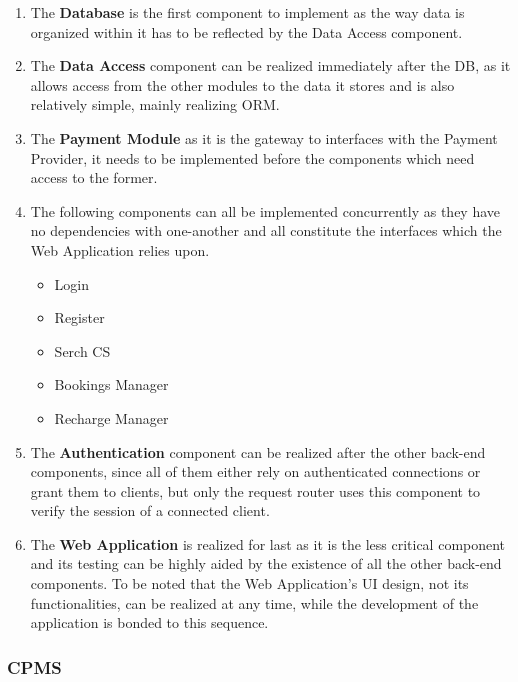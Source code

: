 \documentclass[11pt]{article}
\begin{document}
\begin{enumerate}
    \item The \textbf{Database} is the first component to implement as the way data is organized within it has to be reflected by the Data Access component.
    \item The \textbf{Data Access} component can be realized immediately after the DB, as it allows access from the other modules to the data it stores and is also relatively simple, mainly realizing ORM.
    \item The \textbf{Payment Module} as it is the gateway to interfaces with the Payment Provider, it needs to be implemented before the components which need access to the former.
    \item The following components can all be implemented concurrently as they have no dependencies with one-another and all constitute the interfaces which the Web Application relies upon.
    \begin{itemize}
        \item Login
        \item Register
        \item Serch CS
        \item Bookings Manager
        \item Recharge Manager
    \end{itemize}
    \item The \textbf{Authentication} component can be realized after the other back-end components, since all of them either rely on authenticated connections or grant them to clients, but only the request router uses this component to verify the session of a connected client.
    \item The \textbf{Web Application} is realized for last as it is the less critical component and its testing can be highly aided by the existence of all the other back-end components. To be noted that the Web Application's UI design, not its functionalities, can be realized at any time, while the development of the application is bonded to this sequence.
\end{enumerate}

\subsubsection{CPMS}
\end{document}
